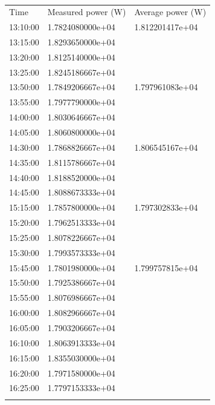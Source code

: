 \begin{table}
  \begin{center}
    \caption{}
    \label{tab:2}
    \begin{tabular}{lll}
      \hline\noalign{\smallskip}
      Time & Measured power (W) & Average power (W)  \\
      \noalign{\smallskip}\hline\noalign{\smallskip}
       13:10:00 & 1.7824080000e+04 & 1.812201417e+04 \\ 
       13:15:00 & 1.8293650000e+04 &  \\ 
       13:20:00 & 1.8125140000e+04 &  \\ 
       13:25:00 & 1.8245186667e+04 &  \\ 
      \noalign{\smallskip}\hline\noalign{\smallskip}
       13:50:00 & 1.7849206667e+04 & 1.797961083e+04 \\ 
       13:55:00 & 1.7977790000e+04 &  \\ 
       14:00:00 & 1.8030646667e+04 &  \\ 
       14:05:00 & 1.8060800000e+04 &  \\ 
      \noalign{\smallskip}\hline\noalign{\smallskip}
       14:30:00 & 1.7868826667e+04 & 1.806545167e+04 \\ 
       14:35:00 & 1.8115786667e+04 &  \\ 
       14:40:00 & 1.8188520000e+04 &  \\ 
       14:45:00 & 1.8088673333e+04 &  \\ 
      \noalign{\smallskip}\hline\noalign{\smallskip}
       15:15:00 & 1.7857800000e+04 & 1.797302833e+04 \\ 
       15:20:00 & 1.7962513333e+04 &  \\ 
       15:25:00 & 1.8078226667e+04 &  \\ 
       15:30:00 & 1.7993573333e+04 &  \\ 
      \noalign{\smallskip}\hline\noalign{\smallskip}
       15:45:00 & 1.7801980000e+04 & 1.799757815e+04 \\ 
       15:50:00 & 1.7925386667e+04 &  \\ 
       15:55:00 & 1.8076986667e+04 &  \\ 
       16:00:00 & 1.8082966667e+04 &  \\ 
       16:05:00 & 1.7903206667e+04 &  \\ 
       16:10:00 & 1.8063913333e+04 &  \\ 
       16:15:00 & 1.8355030000e+04 &  \\ 
       16:20:00 & 1.7971580000e+04 &  \\ 
       16:25:00 & 1.7797153333e+04 &  \\ 
      \noalign{\smallskip}\hline
    \end{tabular}
  \end{center}
\end{table}

